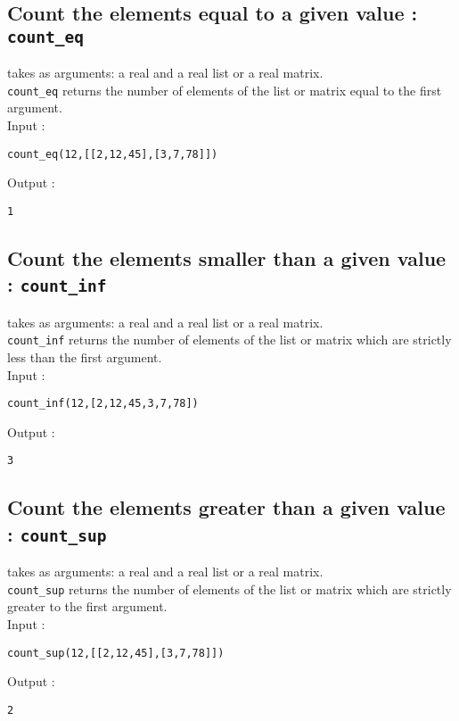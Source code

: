 \documentclass[a4paper,11pt]{book}
\begin{document}
\subsection{Count the elements equal to a given value : {\tt count\_eq}}
 takes as arguments: a real and a real list or 
a real matrix.\\
{\tt count\_eq} returns the number of elements of the list or matrix
equal to the first argument.\\
Input :
\begin{center}{\tt count\_eq(12,[[2,12,45],[3,7,78]])}\end{center}
Output :
\begin{center}{\tt  1}\end{center}

\subsection{Count the elements smaller than a given value : {\tt count\_inf}}
 takes as arguments: a real and a real list or a real
matrix.\\
{\tt count\_inf} returns the number of elements of the list or
matrix which are strictly less than the first argument.\\
Input :
\begin{center}{\tt count\_inf(12,[2,12,45,3,7,78])}\end{center}
Output :
\begin{center}{\tt  3}\end{center}

\subsection{Count the elements greater than a given value : {\tt count\_sup}}
 takes as arguments: a real and a real list or a real
 matrix.\\
{\tt count\_sup} returns the number of elements of the list or matrix
which are strictly greater to the first argument.\\
Input :
\begin{center}{\tt count\_sup(12,[[2,12,45],[3,7,78]])}\end{center}
Output :
\begin{center}{\tt  2}\end{center}
\end{document}
